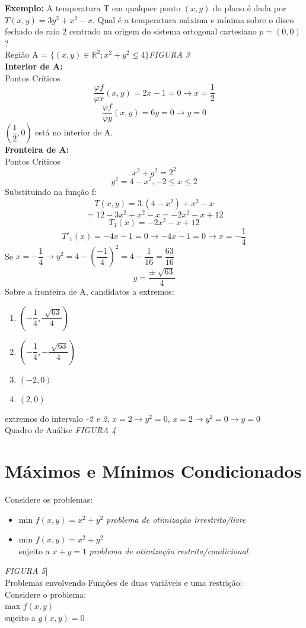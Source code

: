 \documentclass{article}
\begin{document}
		\textbf{Exemplo:} A temperatura T em qualquer ponto $(x,y)$ do plano é dada por $T(x,y) = 3y^2+x^2-x$. Qual é a temperatura máxima e mínima sobre o disco fechado de raio 2 centrado na origem do sistema ortogonal cartesiano $p=(0,0)$?\\
		Região A = $\{(x,y) \in \mathbb{R}^2; x^2+y^2 \leq 4\}$\textit{FIGURA 3}\\
		\textbf{Interior de A: }\\
		Pontos Críticos\\
		$$\dfrac{\varphi f}{\varphi x}(x,y)=2x-1=0 \to x=\dfrac{1}{2}$$%
		$$\dfrac{\varphi f}{\varphi y}(x,y)=6y=0 \to y=0$$
		$(\dfrac{1}{2},0)$ está no interior de A.\\
		\textbf{Fronteira de A:}\\
		Pontos Críticos\\
		$$x^2+y^2 =2^2$$
		$$y^2=4-x^2, -2 \leq x \leq 2$$
		Substituindo na função f:\\
		$$T(x,y) = 3.(4-x^2)+x^2-x$$
		$$= 12-3x^2+x^2-x = -2x^2-x+12$$
		$$T_1(x) = -2x^2 -x +12$$
		$$T'_1(x) = -4x-1=0 \to -4x-1=0 \to x = -\dfrac{1}{4}$$
		Se $x = -\dfrac{1}{4}\to y^2 = 4-(\dfrac{-1}{4})^2= 4-\dfrac{1}{16}= \dfrac{63}{16}$
		$$y = \dfrac{\pm \sqrt[]{63}}{4}$$
		Sobre a fronteira de A, candidatos a extremos:
			\begin{enumerate}
				\item $(-\dfrac{1}{4},\dfrac{\sqrt[]{63}}{4})$
				\item $(-\dfrac{1}{4},-\dfrac{\sqrt[]{63}}{4})$
				\item $ (-2,0)$
				\item $(2,0)$
			\end{enumerate}
		extremos do intervalo \textit{-2 e 2}, $x=2\to y^2=0$, $x=2 \to y^2 =0 \to y = 0$\\
		Quadro de Análise \textit{FIGURA 4}
		
	\section{Máximos e Mínimos Condicionados}
		Considere os problemas:
		\begin{itemize}
			\item min $f(x,y) = x^2+y^2$ \textit{problema de otimização irrestrito/livre}
			\item min $f(x,y) = x^2 +y^2$\\
			sujeito a $x+y=1$  \textit{problema de otimização restrita/condicional}
		\end{itemize}
		\textit{FIGURA 5}]\\
		Problemas envolvendo Funções de duas variáveis e uma restrição:\\
		Considere o problema:\\
		max $f(x,y)$\\
		sujeito a $g(x,y) = 0$\\
		
\end{document}
